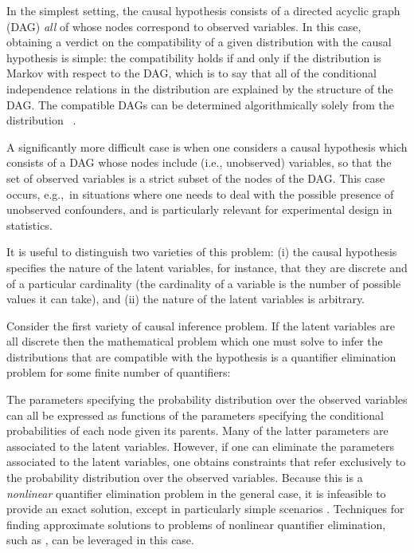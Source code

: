 
In the simplest setting, the causal hypothesis consists of a directed acyclic graph (DAG) {\em all} of whose nodes correspond to observed variables. In this case, obtaining a verdict on the compatibility of a given distribution with the causal hypothesis is simple: the compatibility holds if and only if the distribution is Markov with respect to the DAG, which is to say that all of the conditional independence relations in the distribution are explained by the structure of the DAG. 
The compatible DAGs can be determined algorithmically solely from the distribution
~\cite{pearl2009causality}.

A significantly more difficult case is when one considers a causal hypothesis which consists of a DAG whose nodes include  (i.e., unobserved) variables, so that the set of observed variables is a strict subset of the nodes of the DAG. This case occurs, e.g.,~in situations where one needs to deal with the possible presence of unobserved confounders, and is particularly relevant for experimental design in statistics. 

It is useful to distinguish two varieties of this problem: (i) the causal hypothesis specifies the nature of the latent variables, for instance, that they are discrete and of a particular cardinality (the cardinality of a variable is the number of possible values it can take), and (ii) the nature of the latent variables is arbitrary.  

Consider the first variety of causal inference problem.  If the latent variables are all discrete then the mathematical problem which one must solve to infer the distributions that are compatible with the hypothesis is a quantifier elimination problem for some finite number of quantifiers: 

The parameters specifying the probability distribution over the observed variables can all be expressed as functions of the parameters specifying the conditional probabilities of each node given its parents.  Many of the latter parameters are associated to the latent variables.  However, if one can eliminate the parameters associated to the latent variables, one obtains constraints that refer exclusively to the probability distribution over the observed variables.  Because this is a {\em nonlinear} quantifier elimination problem in the general case, it is infeasible to provide an exact solution, except in particularly simple scenarios \cite{LeeSpekkens}. Techniques for finding approximate solutions to problems of nonlinear quantifier elimination, such as \cite{ChavesPolynomial}, can be leveraged in this case.

